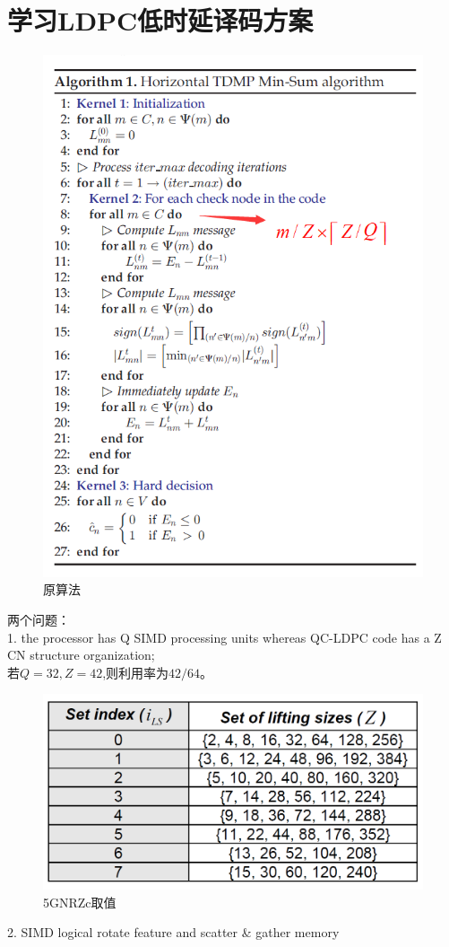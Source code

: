 \documentclass{article}
\begin{document}
\section{学习LDPC低时延译码方案}
\begin{figure}[H]
	\centering
	\includegraphics[width = .8\textwidth]{al.png}
	\caption{原算法}
\end{figure}
两个问题：\\
1. the processor has Q SIMD processing units whereas QC-LDPC 
code has a Z CN structure organization;\\
若$Q=32,Z=42$,则利用率为$42/64$。
\begin{figure}[H]
	\centering
	\includegraphics[width = .6\textwidth]{zc.png}
	\caption{5GNRZc取值}
\end{figure}
2. SIMD logical rotate feature and scatter \& gather memory 
\end{document}
